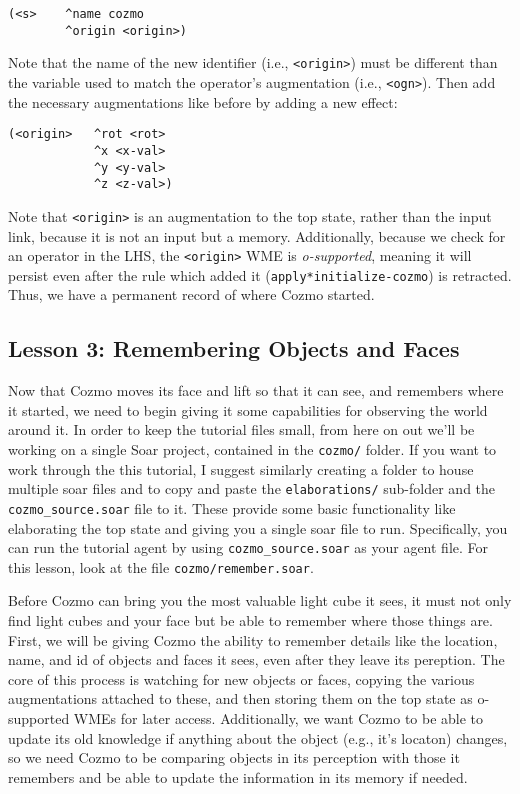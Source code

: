 \begin{verbatim}
(<s>    ^name cozmo
        ^origin <origin>)
\end{verbatim}

Note that the name of the new identifier (i.e.,
\texttt{\textless{}origin\textgreater{}}) must be different than the
variable used to match the operator's augmentation (i.e.,
\texttt{\textless{}ogn\textgreater{}}). Then add the necessary
augmentations like before by adding a new effect:

\begin{verbatim}
(<origin>   ^rot <rot>
            ^x <x-val>
            ^y <y-val>
            ^z <z-val>)
\end{verbatim}

Note that \texttt{\textless{}origin\textgreater{}} is an augmentation to
the top state, rather than the input link, because it is not an input
but a memory. Additionally, because we check for an operator in the LHS,
the \texttt{\textless{}origin\textgreater{}} WME is \emph{o-supported},
meaning it will persist even after the rule which added it
(\texttt{apply*initialize-cozmo}) is retracted. Thus, we have a
permanent record of where Cozmo started.

\hypertarget{lesson-3-remembering-objects-and-faces}{%
\subsection{Lesson 3: Remembering Objects and
Faces}\label{lesson-3-remembering-objects-and-faces}}

Now that Cozmo moves its face and lift so that it can see, and remembers
where it started, we need to begin giving it some capabilities for
observing the world around it. In order to keep the tutorial files
small, from here on out we'll be working on a single Soar project,
contained in the \texttt{cozmo/} folder. If you want to work through the
this tutorial, I suggest similarly creating a folder to house multiple
soar files and to copy and paste the \texttt{elaborations/} sub-folder
and the \texttt{cozmo\_source.soar} file to it. These provide some basic
functionality like elaborating the top state and giving you a single
soar file to run. Specifically, you can run the tutorial agent by using
\texttt{cozmo\_source.soar} as your agent file. For this lesson, look at
the file \texttt{cozmo/remember.soar}.

Before Cozmo can bring you the most valuable light cube it sees, it must
not only find light cubes and your face but be able to remember where
those things are. First, we will be giving Cozmo the ability to remember
details like the location, name, and id of objects and faces it sees,
even after they leave its pereption. The core of this process is
watching for new objects or faces, copying the various augmentations
attached to these, and then storing them on the top state as o-supported
WMEs for later access. Additionally, we want Cozmo to be able to update
its old knowledge if anything about the object (e.g., it's locaton)
changes, so we need Cozmo to be comparing objects in its perception with
those it remembers and be able to update the information in its memory
if needed.


